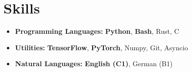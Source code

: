 \section*{Skills}
\begin{itemize}[itemsep=0mm]

    \item \textbf{Programming Languages:} \textbf{Python}, \textbf{Bash}, Rust, C
    \item \textbf{Utilities:} \textbf{TensorFlow}, \textbf{PyTorch}, Numpy, Git, Asyncio
    \item \textbf{Natural Languages:} \textbf{English (C1)}, German (B1)

\end{itemize}
